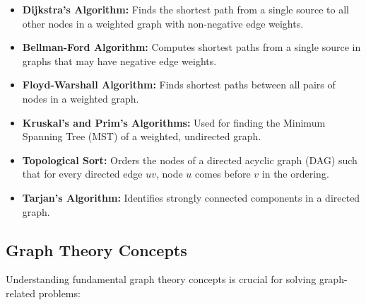 \begin{itemize}
    \item \textbf{Dijkstra's Algorithm:} Finds the shortest path from a single source to all other nodes in a weighted graph with non-negative edge weights.
    
    \item \textbf{Bellman-Ford Algorithm:} Computes shortest paths from a single source in graphs that may have negative edge weights.
    
    \item \textbf{Floyd-Warshall Algorithm:} Finds shortest paths between all pairs of nodes in a weighted graph.
    
    \item \textbf{Kruskal's and Prim's Algorithms:} Used for finding the Minimum Spanning Tree (MST) of a weighted, undirected graph.
    
    \item \textbf{Topological Sort:} Orders the nodes of a directed acyclic graph (DAG) such that for every directed edge \( uv \), node \( u \) comes before \( v \) in the ordering.
    
    \item \textbf{Tarjan's Algorithm:} Identifies strongly connected components in a directed graph.
\end{itemize}

\subsection*{Graph Theory Concepts}
Understanding fundamental graph theory concepts is crucial for solving graph-related problems:

